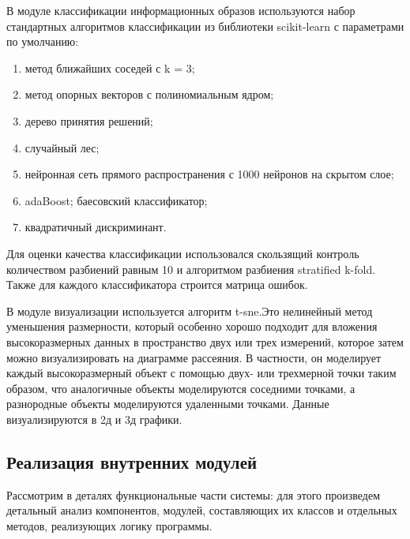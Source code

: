 В модуле классификации информационных образов используются набор стандартных алгоритмов классификации из библиотеки scikit-learn с параметрами по умолчанию:
\begin{enumerate}
\item метод ближайших соседей с k = 3;
\item метод опорных векторов с полиномиальным ядром;
\item дерево принятия решений;
\item случайный лес;
\item нейронная сеть прямого распространения с 1000 нейронов на скрытом слое;
\item adaBoost;
 баесовский классификатор;
\item квадратичный дискриминант.
\end{enumerate}

Для оценки качества классификации использовался скользящий контроль количеством разбиений равным 10 и алгоритмом разбиения stratified k-fold. Также для каждого классификатора строится матрица ошибок.

В модуле визуализации используется алгоритм t-sne.Это нелинейный метод уменьшения размерности, который особенно хорошо подходит для вложения высокоразмерных данных в пространство двух или трех измерений, которое затем можно визуализировать на диаграмме рассеяния. В частности, он моделирует каждый высокоразмерный объект с помощью двух- или трехмерной точки таким образом, что аналогичные объекты моделируются соседними точками, а разнородные объекты моделируются удаленными точками. Данные визуализируются в 2д и 3д графики. 


\subsection{Реализация внутренних модулей}
Рассмотрим в деталях функциональные части системы: для этого произведем детальный анализ компонентов, модулей, составляющих их классов и отдельных методов, реализующих логику программы.



